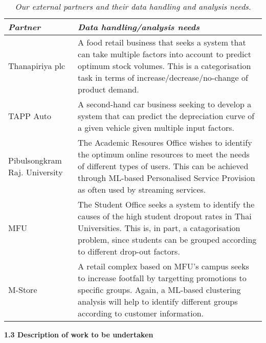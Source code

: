 \documentclass[11pt]{article}
\begin{document}
\begin{table}[h]
\begin{tabular}{p{3cm}|p{13.1cm}}
  {\it Partner} & {\it Data handling/analysis needs}\\
  \hline
  \hline
  Thanapiriya plc & A food retail business that seeks a system that can take multiple factors into account to predict optimum stock volumes. This is a categorisation task in terms of increase/decrease/no-change of product demand.\\
  \hline
  TAPP Auto & A second-hand car business seeking to develop a system that can predict the depreciation curve of a given vehicle given multiple input factors.\\
  \hline
  Pibulsongkram Raj. University & The Academic Resoures Office wishes to identify the optimum online resources to meet the needs of different types of users. This can be achieved through ML-based Personalised Service Provision as often used by streaming services.\\
  \hline
  MFU & The Student Office seeks a system to identify the causes of the high student dropout rates in Thai Universities. This is, in part, a catagorisation problem, since students can be grouped according to different drop-out factors. \\
  \hline
  M-Store & A retail complex based on MFU's campus seeks to increase footfall by targetting promotions to specific groups. Again, a ML-based clustering analysis will help to identify different groups according to customer information. \\
  \hline
\end{tabular}
\caption{\it Our external partners and their data handling and analysis needs. }
\vspace{-5mm}
\end{table}

\vspace{3mm}
\noindent
{\large \bf 1.3 Description of work to be undertaken}
\end{document}
